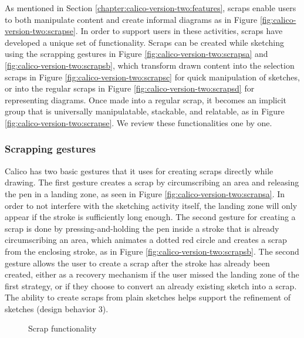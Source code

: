 As mentioned in Section \ref{chapter:calico-version-two:features}, scraps enable users to both manipulate content and create informal diagrams as in Figure \ref{fig:calico-version-two:scrapse}. In order to support users in these activities, scraps have developed a unique set of functionality. Scraps can be created while sketching using the scrapping gestures in Figure \ref{fig:calico-version-two:scrapsa} and \ref{fig:calico-version-two:scrapsb}, which transform drawn content into the selection scraps in Figure \ref{fig:calico-version-two:scrapsc} for quick manipulation of sketches, or into the regular scraps in Figure \ref{fig:calico-version-two:scrapsd} for representing diagrams. Once made into a regular scrap, it becomes an implicit group that is universally manipulatable, stackable, and relatable, as in Figure \ref{fig:calico-version-two:scrapse}. We review these functionalities one by one.

\subsubsection{Scrapping gestures} Calico has two basic gestures that it uses for creating scraps directly while drawing. The first gesture creates a scrap by circumscribing an area and releasing the pen in a landing zone, as seen in Figure \ref{fig:calico-version-two:scrapsa}. In order to not interfere with the sketching activity itself, the landing zone will only appear if the stroke is sufficiently long enough. The second gesture for creating a scrap is done by pressing-and-holding the pen inside a stroke that is already circumscribing an area, which animates a dotted red circle and creates a scrap from the enclosing stroke, as in Figure \ref{fig:calico-version-two:scrapsb}. The second gesture allows the user to create a scrap after the stroke has already been created, either as a recovery mechanism if the user missed the landing zone of the first strategy, or if they choose to convert an already existing sketch into a scrap. The ability to create scraps from plain sketches helps support the refinement of sketches (design behavior 3).

\begin{figure}%
  \centering
   \caption {Scrap functionality}
   \label{fig:calico-version-two:scraps}
\end{figure}%

